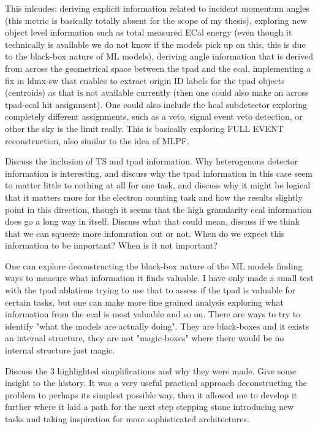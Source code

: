 This inlcudes: deriving explicit information related to incident momentum angles (this metric is basically totally absent for the scope of my thesis), exploring new object level information such as total measured ECal energy (even though it technically is available we do not know if the models pick up on this, this is due to the black-box nature of ML models), deriving angle information that is derived from across the geometrical space between the tpad and the ecal, implementing a fix in ldmx-sw that enables to extract origin ID labels for the tpad objects (centroids) as that is not available currently (then one could also make an across tpad-ecal hit assignment). One could also include the hcal subdetector exploring completely different assignments, such as a veto, signal event veto detection, or other the sky is the limit really. This is basically exploring FULL EVENT reconstruction, also similar to the idea of MLPF. 

Discuss the inclusion of TS and tpad information. Why heterogenous detector information is interesting, and discuss why the tpad information in this case seem to matter little to nothing at all for one task, and discuss why it might be logical that it matters more for the electron counting task and how the results slightly point in this direction, though it seems that the high granularity ecal information does go a long way in itself. Discuss what that could mean, discuss if we think that we can squeeze more infomration out or not. When do we expect this information to be important? When is it not important? 

One can explore deconstructing the black-box nature of the ML models finding ways to measure what information it finds valuable. I have only made a small test with the tpad ablations trying to use that to assess if the tpad is valuable for certain tasks, but one can make more fine grained analysis exploring what information from the ecal is most valuable and so on. There are ways to try to identify "what the models are actually doing". They are black-boxes and it exists an internal structure, they are not "magic-boxes" where there would be no internal structure just magic. 

Discuss the 3 highlighted simplifications and why they were made. Give some insight to the history. It was a very useful practical approach deconstructing the problem to perhaps its simplest possible way, then it allowed me to develop it further where it laid a path for the next step stepping stone introducing new tasks and taking inspiration for more sophisticated architectures. 


